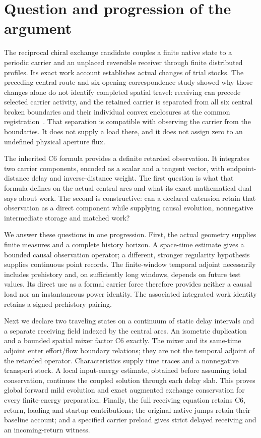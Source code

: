 \section{Question and progression of the argument}\label{sec:question}
The reciprocal chiral exchange candidate couples a finite native state to a periodic carrier and an unplaced reversible receiver through finite distributed profiles. Its exact work account establishes actual changes of trial stocks. The preceding central-route and six-opening correspondence study showed why those changes alone do not identify completed spatial travel: receiving can precede selected carrier activity, and the retained carrier is separated from all six central broken boundaries and their individual convex enclosures at the common registration~\cite{centralpaper}. That separation is compatible with observing the carrier from the boundaries. It does not supply a load there, and it does not assign zero to an undefined physical aperture flux.

The inherited C6 formula provides a definite retarded observation. It integrates two carrier components, encoded as a scalar and a tangent vector, with endpoint-distance delay and inverse-distance weight. The first question is what that formula defines on the actual central arcs and what its exact mathematical dual says about work. The second is constructive: can a declared extension retain that observation as a direct component while supplying causal evolution, nonnegative intermediate storage and matched work?

We answer these questions in one progression. First, the actual geometry supplies finite measures and a complete history horizon. A space-time estimate gives a bounded causal observation operator; a different, stronger regularity hypothesis supplies continuous point records. The finite-window temporal adjoint necessarily includes prehistory and, on sufficiently long windows, depends on future test values. Its direct use as a formal carrier force therefore provides neither a causal load nor an instantaneous power identity. The associated integrated work identity retains a signed prehistory pairing.

Next we declare two traveling states on a continuum of static delay intervals and a separate receiving field indexed by the central arcs. An isometric duplication and a bounded spatial mixer factor C6 exactly. The mixer and its same-time adjoint enter effort/flow boundary relations; they are not the temporal adjoint of the retarded operator. Characteristics supply time traces and a nonnegative transport stock. A local input-energy estimate, obtained before assuming total conservation, continues the coupled solution through each delay slab. This proves global forward mild evolution and exact augmented exchange conservation for every finite-energy preparation. Finally, the full receiving equation retains C6, return, loading and startup contributions; the original native jumps retain their baseline account; and a specified carrier preload gives strict delayed receiving and an incoming-return witness.

